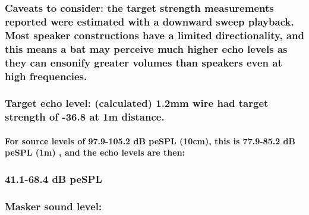 \documentclass[11pt]{article}
\begin{document}
\hypertarget{caveats-to-consider-the-target-strength-measurements-reported-were-estimated-with-a-downward-sweep-playback.-most-speaker-constructions-have-a-limited-directionality-and-this-means-a-bat-may-perceive-much-higher-echo-levels-as-they-can-ensonify-greater-volumes-than-speakers-even-at-high-frequencies.}{%
\subsubsection{Caveats to consider: the target strength measurements
reported were estimated with a downward sweep playback. Most speaker
constructions have a limited directionality, and this means a bat may
perceive much higher echo levels as they can ensonify greater volumes
than speakers even at high
frequencies.}\label{caveats-to-consider-the-target-strength-measurements-reported-were-estimated-with-a-downward-sweep-playback.-most-speaker-constructions-have-a-limited-directionality-and-this-means-a-bat-may-perceive-much-higher-echo-levels-as-they-can-ensonify-greater-volumes-than-speakers-even-at-high-frequencies.}}

\hypertarget{target-echo-level-calculated-1.2mm-wire-had-target-strength-of--36.8-at-1m-distance.}{%
\subsubsection{Target echo level: (calculated) 1.2mm wire had target
strength of -36.8 at 1m
distance.}\label{target-echo-level-calculated-1.2mm-wire-had-target-strength-of--36.8-at-1m-distance.}}

\hypertarget{for-source-levels-of-97.9-105.2-db-pespl-10cm-this-is-77.9-85.2-db-pespl-1m-and-the-echo-levels-are-then}{%
\paragraph{For source levels of 97.9-105.2 dB peSPL (10cm), this is
77.9-85.2 dB peSPL (1m) , and the echo levels are
then:}\label{for-source-levels-of-97.9-105.2-db-pespl-10cm-this-is-77.9-85.2-db-pespl-1m-and-the-echo-levels-are-then}}

\hypertarget{db-pespl}{%
\subsubsection{41.1-68.4 dB peSPL}\label{db-pespl}}

\hypertarget{masker-sound-level}{%
\subsubsection{Masker sound level:}\label{masker-sound-level}}
\end{document}
